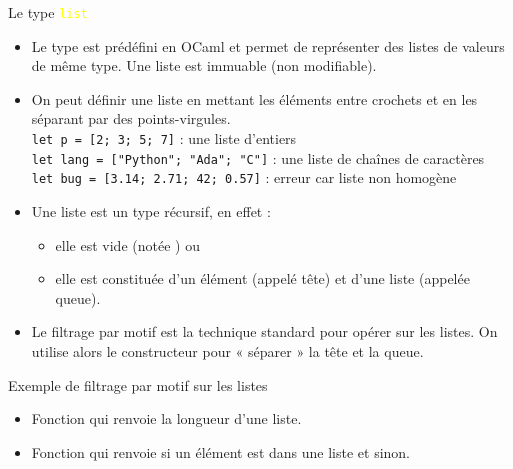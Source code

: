 \documentclass[10pt]{beamer}
\begin{document}
\begin{frame}{\Ctitle}{\stitle}
	\begin{block}{Le type \textcolor{yellow}{\tt list}}
		\begin{itemize}
			\item<1-> Le type  est prédéfini en OCaml et permet de représenter des listes de valeurs \textcolor{BrickRed}{de même type}. Une liste est \textcolor{BrickRed}{immuable} (non modifiable).
			\item<2-> On peut définir une liste en mettant les éléments entre crochets et en les séparant par des points-virgules.\\
			\onslide<3-> \texttt{let p = [2; 3; 5; 7]} : une liste d'entiers \\
			\onslide<4-> \texttt{let lang = ["Python"; "Ada"; "C"]} : une liste de chaînes de caractères \\
			\onslide<5-> \texttt{let bug = [3.14; 2.71; 42; 0.57]} : erreur car liste non homogène
			\item<6-> Une liste est un type récursif, en effet :
			\begin{itemize}
				\item<7-> elle est vide (notée \kw{[]}) ou
				\item<8-> elle est constituée d'un élément (appelé tête) et d'une liste (appelée queue).
			\end{itemize}
			\item<9-> Le filtrage par motif est la technique standard pour opérer sur les listes. On utilise alors le constructeur \kw{::} pour « séparer » la tête et la queue.
		\end{itemize}
	\end{block}
\end{frame}

\begin{frame}{\Ctitle}{\stitle}
	\begin{exampleblock}{Exemple de filtrage par motif sur les listes}
		\begin{itemize}
			\item<1-> Fonction qui renvoie la longueur d'une liste.
			\onslide<2->
			\item<3-> Fonction qui renvoie  si un élément est dans une liste et  sinon.
			\onslide<4->
		\end{itemize}
	\end{exampleblock}
\end{frame}
\end{document}
